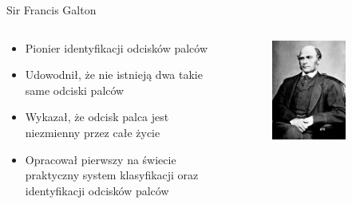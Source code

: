\documentclass{beamer}
\begin{document}
\begin{frame}{Sir Francis Galton}
\begin{columns}
    \begin{column}[T]{.6\textwidth}
        \begin{itemize}
            \item Pionier identyfikacji odcisków palców
            \item Udowodnił, że nie istnieją dwa takie same odciski palców
            \item Wykazał, że odcisk palca jest niezmienny przez całe życie
            \item Opracował pierwszy na świecie praktyczny system klasyfikacji oraz identyfikacji odcisków palców
        \end{itemize}
    \end{column}
    \hfill
    \begin{column}[T]{.4\textwidth}
        \begin{figure}
            \centering
            \includegraphics[width=0.7\textwidth]{History/Francis_Galton_1850s.jpg}
        \end{figure}
    \end{column}
\end{columns}
\end{frame}
\end{document}
